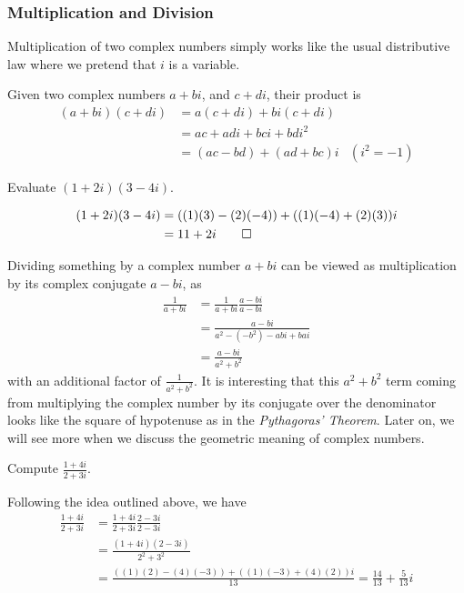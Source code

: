 \subsubsection{Multiplication and Division}
Multiplication of two complex numbers simply works like the usual distributive law where we pretend that $i$ is a variable.
\begin{defn}
Given two complex numbers $a + bi$, and $c + di$, their product is
\begin{align}
(a + bi)(c + di) &= a(c + di) + bi(c + di) \nonumber\\
&= ac + adi + bci + bdi^2 \nonumber \\
&= (ac - bd) + (ad + bc)i & (i^2 = -1)
\end{align}
\end{defn}

\begin{exmp}
Evaluate $(1+2i)(3-4i)$.
\end{exmp}
\begin{solution}
\begin{align*}
(1+2i)(3-4i) &= ((1)(3) - (2)(-4)) + ((1)(-4) + (2)(3))i \\
&= 11 + 2i \qedhere
\end{align*}
\end{solution}

Dividing something by a complex number $a+bi$ can be viewed as multiplication by its complex conjugate $a-bi$, as
\begin{align}
\frac{1}{a+bi} &= \frac{1}{a+bi}\frac{a-bi}{a-bi} \nonumber \\
&= \frac{a-bi}{a^2 - (-b^2) - abi + bai} \nonumber \\
&= \frac{a-bi}{a^2 + b^2}
\end{align}
with an additional factor of $\frac{1}{a^2+b^2}$. It is interesting that this $a^2+b^2$ term coming from multiplying the complex number by its conjugate over the denominator looks like the square of hypotenuse as in the \textit{Pythagoras' Theorem}. Later on, we will see more when we discuss the geometric meaning of complex numbers.

\begin{exmp}
Compute $\frac{1+4i}{2+3i}$.
\end{exmp}
\begin{solution}
Following the idea outlined above, we have
\begin{align*}
\frac{1+4i}{2+3i} &= \frac{1+4i}{2+3i}\frac{2-3i}{2-3i} \\
&= \frac{(1+4i)(2-3i)}{2^2+3^2} \\
&= \frac{((1)(2) - (4)(-3)) + ((1)(-3) + (4)(2))i}{13} = \frac{14}{13}+\frac{5}{13}i
\end{align*}
\end{solution}

